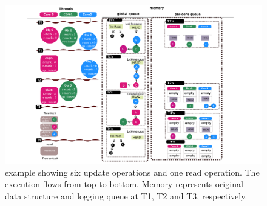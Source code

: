 \begin{figure}[tb]
  \begin{center}
     \includegraphics[width=1.0\textwidth,height=0.4\textheight]{fig/basic_gldu}
  \end{center}
  \caption{ example showing six update operations and one read
  operation. The execution flows from top to bottom. Memory represents original
  data structure and logging queue at T1, T2 and T3, respectively.}
  \label{fig:basic}
\end{figure}


\ifkor
\else
\fi

